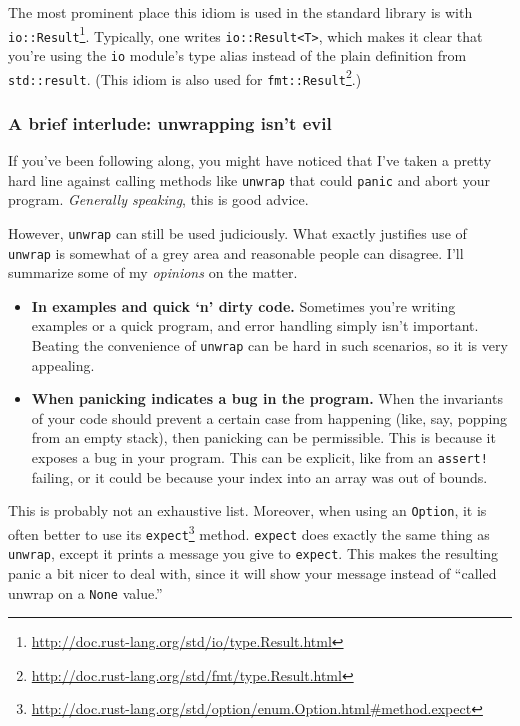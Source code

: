 \documentclass[a4paper,]{book}
\renewcommand{\href}[2]{#2\footnote{\url{#1}}}
\providecommand{\tightlist}{%
  \setlength{\itemsep}{0pt}\setlength{\parskip}{0pt}}
\begin{document}
The most prominent place this idiom is used in the standard library is
with
\href{http://doc.rust-lang.org/std/io/type.Result.html}{\texttt{io::Result}}.
Typically, one writes \texttt{io::Result\textless{}T\textgreater{}},
which makes it clear that you're using the \texttt{io} module's type
alias instead of the plain definition from \texttt{std::result}. (This
idiom is also used for
\href{http://doc.rust-lang.org/std/fmt/type.Result.html}{\texttt{fmt::Result}}.)

\hypertarget{a-brief-interlude-unwrapping-isnt-evil}{\subsubsection{A
brief interlude: unwrapping isn't
evil}\label{a-brief-interlude-unwrapping-isnt-evil}}

If you've been following along, you might have noticed that I've taken a
pretty hard line against calling methods like \texttt{unwrap} that could
\texttt{panic} and abort your program. \emph{Generally speaking}, this
is good advice.

However, \texttt{unwrap} can still be used judiciously. What exactly
justifies use of \texttt{unwrap} is somewhat of a grey area and
reasonable people can disagree. I'll summarize some of my
\emph{opinions} on the matter.

\begin{itemize}
\tightlist
\item
  \textbf{In examples and quick `n' dirty code.} Sometimes you're
  writing examples or a quick program, and error handling simply isn't
  important. Beating the convenience of \texttt{unwrap} can be hard in
  such scenarios, so it is very appealing.
\item
  \textbf{When panicking indicates a bug in the program.} When the
  invariants of your code should prevent a certain case from happening
  (like, say, popping from an empty stack), then panicking can be
  permissible. This is because it exposes a bug in your program. This
  can be explicit, like from an \texttt{assert!} failing, or it could be
  because your index into an array was out of bounds.
\end{itemize}

This is probably not an exhaustive list. Moreover, when using an
\texttt{Option}, it is often better to use its
\href{http://doc.rust-lang.org/std/option/enum.Option.html\#method.expect}{\texttt{expect}}
method. \texttt{expect} does exactly the same thing as \texttt{unwrap},
except it prints a message you give to \texttt{expect}. This makes the
resulting panic a bit nicer to deal with, since it will show your
message instead of ``called unwrap on a \texttt{None} value.''
\end{document}
